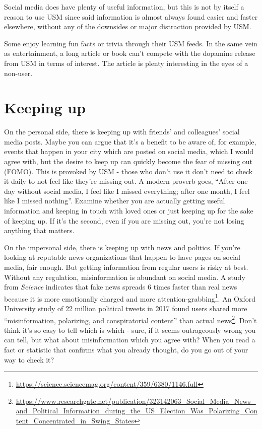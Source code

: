\documentclass[
  openany]{book}
\begin{document}
Social media does have plenty of useful information, but this is not by itself a reason to use USM since said information is almost always found easier and faster elsewhere, without any of the downsides or major distraction provided by USM.

Some enjoy learning fun facts or trivia through their USM feeds. In the same vein as entertainment, a long article or book can't compete with the dopamine release from USM in terms of interest. The article is plenty interesting in the eyes of a non-user.

\section{Keeping up}\label{keeping-up}

On the personal side, there is keeping up with friends' and colleagues' social media posts. Maybe you can argue that it's a benefit to be aware of, for example, events that happen in your city which are posted on social media, which I would agree with, but the desire to keep up can quickly become the fear of missing out (FOMO). This is provoked by USM - those who don't use it don't need to check it daily to not feel like they're missing out. A modern proverb goes, ``After one day without social media, I feel like I missed everything; after one month, I feel like I missed nothing''. Examine whether you are actually getting useful information and keeping in touch with loved ones or just keeping up for the sake of keeping up. If it's the second, even if you are missing out, you're not losing anything that matters.

On the impersonal side, there is keeping up with news and politics. If you're looking at reputable news organizations that happen to have pages on social media, fair enough. But getting information from regular users is risky at best. Without any regulation, misinformation is abundant on social media. A study from \emph{Science} indicates that fake news spreads 6 times faster than real news because it is more emotionally charged and more attention-grabbing\footnote{\url{https://science.sciencemag.org/content/359/6380/1146.full}}. An Oxford University study of 22 million political tweets in 2017 found users shared more ``misinformation, polarizing, and conspiratorial content'' than actual news\footnote{\url{https://www.researchgate.net/publication/323142063_Social_Media_News_and_Political_Information_during_the_US_Election_Was_Polarizing_Content_Concentrated_in_Swing_States}}. Don't think it's so easy to tell which is which - sure, if it seems outrageously wrong you can tell, but what about misinformation which you agree with? When you read a fact or statistic that confirms what you already thought, do you go out of your way to check it?
\end{document}
